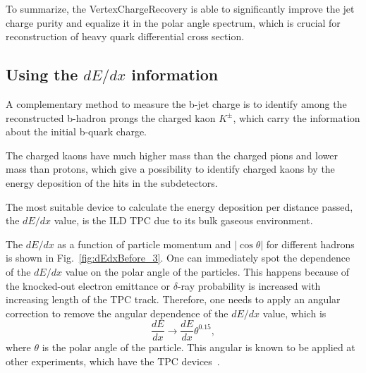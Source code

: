 To summarize, the VertexChargeRecovery is able to significantly improve the jet charge purity and equalize it in the polar angle spectrum, which is crucial for reconstruction of heavy quark differential cross section. 
\subsection{Using the $dE/dx$ information}

A complementary method to measure the b-jet charge is to identify among the reconstructed b-hadron prongs the charged kaon $K^\pm$, which carry the information about the initial b-quark charge. 

The charged kaons have much higher mass than the charged pions and lower mass than protons, which give a possibility to identify charged kaons by the energy deposition of the hits in the subdetectors. 

The most suitable device to calculate the energy deposition per distance passed, the $dE/dx$ value, is the ILD TPC due to its bulk gaseous environment. 


The $dE/dx$ as a function of particle momentum and $|\cos\theta|$ for different hadrons is shown in Fig.~\ref{fig:dEdxBefore_3}. One can immediately spot the dependence of the $dE/dx$ value on the polar angle of the particles. This happens because of the knocked-out electron emittance or $\delta$-ray probability is increased with increasing length of the TPC track. Therefore, one needs to apply an angular correction to remove the angular dependence of the $dE/dx$ value, which is 
\begin{equation}
	\frac{dE}{dx}\to\frac{dE}{dx}\theta^{0.15},
    \label{formula:dEdxCorrection}
\end{equation}
where $\theta$ is the polar angle of the particle. 
This angular is known to be applied at other experiments, which have the TPC devices~\cite{bib:HARP}.

